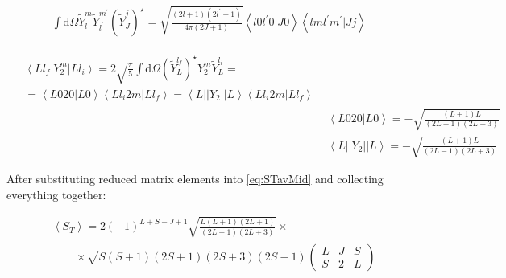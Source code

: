 \begin{align}
    \int \mathrm{d}{\Omega} \tilde{Y}_l^m \tilde{Y}_{l^\prime}^{m^\prime} (\tilde{Y}_J^j)^{\star} = \sqrt{\frac{(2l+1)(2l^\prime+1)}{4\pi(2J+1)}} \left<l0l^\prime0|J0\right> \left<lml^\prime m^\prime|Jj\right>
\end{align}

\begin{align}
    \begin{split}
        &\left<Ll_f\right| Y_2^m \left|L l_i\right> = 2\sqrt{\frac{\pi}{5}} \int \mathrm{d}\Omega (\tilde{Y}_L^{l_f})^\star Y_2^m \tilde{Y}_L^{l_i} =\\
        &= \left<L020|L0\right> \left<Ll_i2m|Ll_f\right> = \left<L||Y_2||L\right> \left<Ll_i2m|Ll_f\right>
    \end{split}\\
    &\left<L020|L0\right> = -\sqrt{\frac{(L+1)L}{(2L-1)(2L+3)}}\\
    &\left<L||Y_2||L\right> = -\sqrt{\frac{(L+1)L}{(2L-1)(2L+3)}}
\end{align}

After substituting reduced matrix elements into \cref{eq:STavMid} and collecting everything together:

\begin{align}
    &\left<S_T\right> = 2 (-1)^{L+S-J+1} \sqrt{\frac{L(L+1)(2L+1)}{(2L-1)(2L+3)}} \times \nonumber \\
    &\qquad\times \sqrt{S(S+1)(2S+1)(2S+3)(2S-1)} \left(\begin{matrix}
                                              L & J & S \\
                                              S & 2 & L
                                           \end{matrix}\right)
\end{align}
